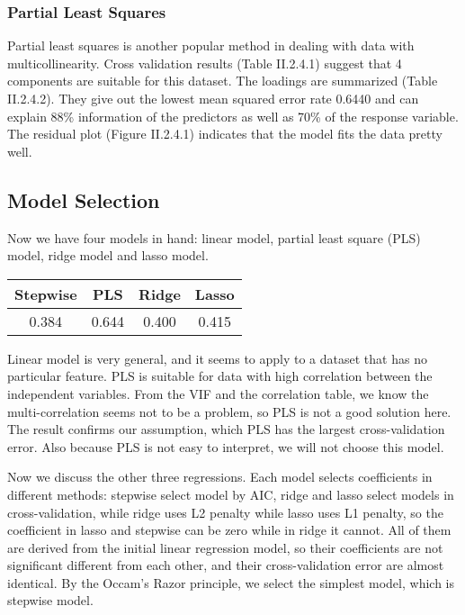 \documentclass{article}
\begin{document}
    \subsubsection{Partial Least Squares}
       Partial least squares is another popular method in dealing with data with multicollinearity. Cross validation results (Table II.2.4.1) suggest that 4 components are suitable for this dataset. The loadings are summarized (Table II.2.4.2). They give out the lowest mean squared error rate 0.6440 and can explain 88\% information of the predictors as well as 70\% of the response variable. The residual plot (Figure II.2.4.1) indicates that the model fits the data pretty well.

  \subsection{Model Selection}
       Now we have four models in hand: linear model, partial least square (PLS) model, ridge model and lasso model.

       \begin{center}
         \begin{tabular}{c c c c}
           \hline
           Stepwise & PLS & Ridge & Lasso\\
           \hline
           0.384 & 0.644 & 0.400 & 0.415\\
           \hline
         \end{tabular}
       \end{center}

       Linear model is very general, and it seems to apply to a dataset that has no particular feature. PLS is suitable for data with high correlation between the independent variables. From the VIF and the correlation table, we know the multi-correlation seems not to be a problem, so PLS is not a good solution here. The result confirms our assumption, which PLS has the largest cross-validation error. Also because PLS is not easy to interpret, we will not choose this model.

       Now we discuss the other three regressions. Each model selects coefficients in different methods: stepwise select model by AIC, ridge and lasso select models in cross-validation, while ridge uses L2 penalty while lasso uses L1 penalty, so the coefficient in lasso and stepwise can be zero while in ridge it cannot. All of them are derived from the initial linear regression model, so their coefficients are not significant different from each other, and their cross-validation error are almost identical. By the Occam's Razor principle, we select the simplest model, which is stepwise model.
\end{document}
